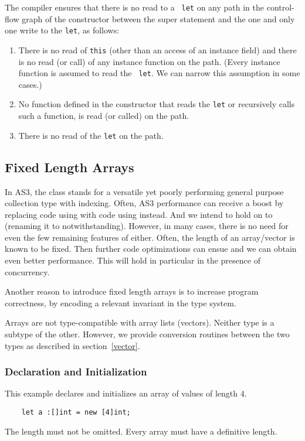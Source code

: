 The compiler ensures that there is no read to a {\tt
  let} on any path in the control-flow graph of the constructor between the
super statement and the one and only one write to the
{\tt let}, as follows:
\begin{enumerate}
\item There is no read of {\tt this} (other than an access of an
  instance field) and there is no read (or call) of any instance function on
  the path. (Every instance function is assumed to read the {\tt
    let}. We can narrow this assumption in some cases.)
\item No function defined in the constructor that reads the {\tt let} or recursively calls such a
function, is read (or called) on the path.
\item There is no read of the {\tt let} on the path.
\end{enumerate}



\subsection{Fixed Length Arrays}
\label{fixed-length-arrays}
In AS3, the class  stands for a versatile yet poorly performing
general purpose collection type with indexing. Often, AS3 performance can
receive a boost by replacing code using  with code using
 instead.
And we intend to hold on to  (renaming it to 
notwithstanding).
However, in many cases, there is no need for even the few remaining features of
 either.
Often, the length of an array/vector is known to be fixed. Then further code
optimizations can ensue and we can obtain even better performance. This will
hold in particular in the presence of concurrency.

Another reason to introduce fixed length arrays is to increase program
correctness, by encoding a relevant invariant in the type system.

Arrays are not type-compatible with array lists (vectors). Neither type is a
subtype of the other. However, we provide conversion routines between the two
types as described in section~\ref{vector}.

\subsubsection{Declaration and Initialization}
This example declares and initializes an array of  values of length
$4$.
\begin{verbatim}
    let a :[]int = new [4]int;
\end{verbatim}
The length must not be omitted. Every array must have a definitive length.

